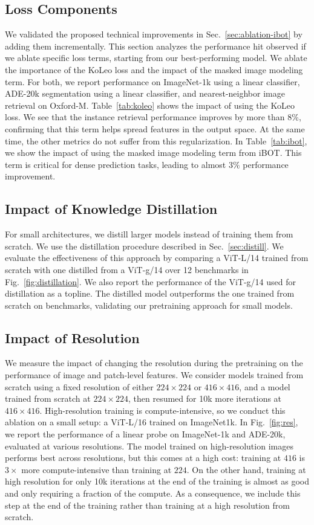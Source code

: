 \subsection{Loss Components} We validated the proposed technical improvements in Sec.~\ref{sec:ablation-ibot} by adding them incrementally. This section analyzes the performance hit observed if we ablate specific loss terms, starting from our best-performing model. We ablate the importance of the KoLeo loss and the impact of the masked image modeling term. For both, we report performance on ImageNet-1k using a linear classifier, ADE-20k segmentation using a linear classifier, and nearest-neighbor image retrieval on Oxford-M.
Table~\ref{tab:koleo} shows the impact of using the KoLeo loss. We see that the instance retrieval performance improves by more than $8\%$, confirming that this term helps spread features in the output space. At the same time, the other metrics do not suffer from this regularization. In Table~\ref{tab:ibot}, we show the impact of using the masked image modeling term from iBOT. This term is critical for dense prediction tasks, leading to almost $3\%$ performance improvement.

\subsection{Impact of Knowledge Distillation} For small architectures, we distill larger models instead of training them from scratch. We use the distillation procedure described in Sec.~\ref{sec:distill}. 
We evaluate the effectiveness of this approach by comparing a ViT-L/14 trained from scratch with one distilled from a ViT-g/14 over 12 benchmarks in Fig.~\ref{fig:distillation}.
We also report the performance of the ViT-g/14 used for distillation as a topline. The distilled model outperforms the one trained from scratch on  benchmarks, validating our pretraining approach for small models.

\subsection{Impact of Resolution} We measure the impact of changing the resolution during the pretraining on the performance of image and patch-level features. We consider models trained from scratch using a fixed resolution of either $224\times 224$ or $416\times 416$, and a model trained from scratch at $224\times 224$, then resumed for 10k more iterations at $416\times 416$. High-resolution training is compute-intensive, so we conduct this ablation on a small setup: a ViT-L/16 trained on ImageNet1k. In Fig.~\ref{fig:res}, we report the performance of a linear probe on ImageNet-1k and ADE-20k, evaluated at various resolutions. The model trained on high-resolution images performs best across resolutions, but this comes at a high cost: training at $416$ is  $3\times{}$ more compute-intensive than training at $224$. On the other hand, training at high resolution for only 10k iterations at the end of the training is almost as good and only requiring a fraction of the compute. As a consequence, we include this step at the end of the training rather than training at a high resolution from scratch.

